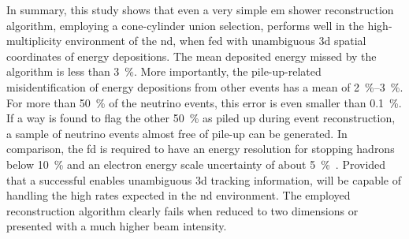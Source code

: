 In summary, this study shows that even a very simple \gls{em} shower reconstruction algorithm, employing a cone-cylinder union selection, performs well in the high-multiplicity environment of the \dune{} \gls{nd}, when fed with unambiguous \gls{3d} spatial coordinates of energy depositions.
The mean deposited energy missed by the algorithm is less than \SI{3}{\percent}.
More importantly, the pile-up-related misidentification of energy depositions from other events has a mean of \SIrange{2}{3}{\percent}.
For more than \SI{50}{\percent} of the neutrino events, this error is even smaller than \SI{0.1}{\percent}.
If a way is found to flag the other \SI{50}{\percent} as piled up during event reconstruction, a sample of neutrino events almost free of pile-up can be generated.
In comparison, the \gls{fd} is required to have an energy resolution for stopping hadrons below \SI{10}{\percent} and an electron energy scale uncertainty of about \SI{5}{\percent}~\cite{dune4}.
Provided that a successful \larpix{} enables unambiguous \gls{3d} tracking information, \AC{} will be capable of handling the high rates expected in the \dune{} \gls{nd} environment.
The employed reconstruction algorithm clearly fails when reduced to two dimensions or presented with a much higher beam intensity.
